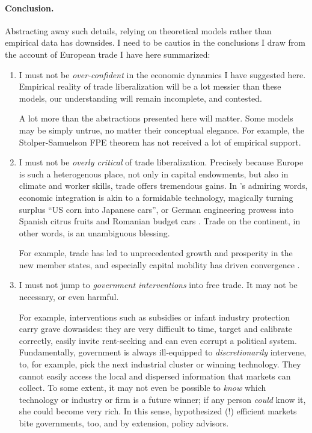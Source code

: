 \paragraph{Conclusion.}
Abstracting away such details, relying on theoretical models rather than empirical data has downsides.
I need to be cautios in the conclusions I draw from the account of European trade I have here summarized:
\begin{enumerate}
	\item I must not be \emph{over-confident} in the economic dynamics I have suggested here.
	Empirical reality of trade liberalization will be a lot messier than these models, our understanding will remain incomplete, and contested.

	A lot more than the abstractions presented here will matter.
	Some models may  be simply untrue, no matter their conceptual elegance.
	For example, the Stolper-Samuelson \gls{FPE} theorem has not received a lot of empirical support.
	\item I must not be \emph{overly critical} of trade liberalization.
	Precisely because Europe is such a heterogenous place, not only in capital endowments, but also in climate and worker skills, trade offers tremendous gains.
	In \citeauthor{Mankiw-2004-aa}'s admiring words, economic integration is akin to a formidable technology, magically turning surplus ``US corn into Japanese cars'', or German engineering prowess into Spanish citrus fruits and Romanian budget cars \citeyearpar[212]{Mankiw-2004-aa}.
	Trade on the continent, in other words, is an unambiguous blessing.

	For example, trade has led to unprecedented growth and prosperity in the new member states, and especially capital mobility has driven convergence \citep{Abiad2007}.
	\item I must not jump to \emph{government interventions} into free trade.
	It may not be necessary, or even harmful.

	For example, interventions such as subsidies or infant industry protection carry grave downsides:
	they are very difficult to time, target and calibrate correctly, easily invite rent-seeking and can even corrupt a political system.
	Fundamentally, government is always ill-equipped to \emph{discretionarily} intervene, to, for example, pick the next industrial cluster or winning technology.
	They cannot easily access the local and dispersed information that markets can collect.
	To some extent, it may not even be possible to \emph{know} which technology or industry or firm is a future winner;
	if any person \emph{could} know it, she could become very rich.
	In this sense, hypothesized (!) efficient markets bite governments, too, and by extension, policy advisors.
\end{enumerate}

